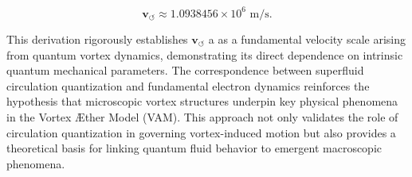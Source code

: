 \begin{equation*}
\mathbf{v}_{\scriptscriptstyle\boldsymbol{\circlearrowleft}} \approx 1.0938456 \times 10^6 \text{ m/s}.
\end{equation*}

This derivation rigorously establishes  $ \mathbf{v}_{\scriptscriptstyle\boldsymbol{\circlearrowleft}} $ a as a fundamental velocity scale arising from quantum vortex dynamics, demonstrating its direct
dependence on intrinsic quantum mechanical parameters. The correspondence between superfluid circulation quantization and fundamental electron dynamics reinforces the hypothesis that microscopic vortex structures underpin key physical phenomena in the Vortex Æther Model (VAM). This approach not only validates the role of circulation quantization in governing vortex-induced motion but also provides a theoretical basis for linking quantum fluid behavior to emergent macroscopic phenomena.